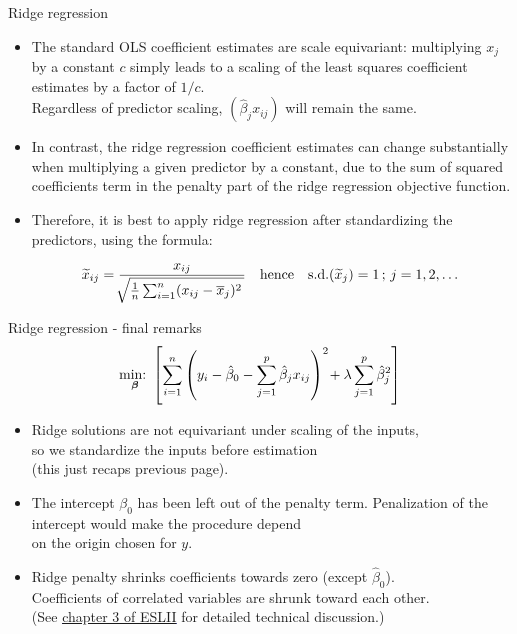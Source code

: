 \documentclass{beamer}
\begin{document}
\begin{frame}{Ridge regression}
\begin{itemize}
\item The standard OLS coefficient estimates are scale
equivariant: multiplying $x_j$ by a constant $c$ simply leads to
a scaling of the least squares coefficient estimates by a
factor of $1/c$.\\ 
\medskip Regardless of predictor scaling, $ ( \hat{\beta}_j x_{ij} )$ will remain the same.
\medskip
\item In contrast, the ridge regression coefficient estimates can
change substantially when multiplying a given predictor by
a constant, due to the sum of squared coefficients term in
the penalty part of the ridge regression objective function.
\medskip
\item Therefore, it is best to apply ridge regression after
standardizing the predictors, using the formula:

$$ \widetilde{x}_{ij} = \frac{x_{ij}}{
   \sqrt[]{\frac{1}{n} \sum_{i=1}^n (x_{ij} - \overline{x}_j)^2 \,}}
   \quad \textnormal{hence} \quad
   \textnormal{s.d.}(\widetilde{x}_{j}) = 1\, ; \, j=1,2,\dots$$
 
\end{itemize}
\end{frame}
\begin{frame}{Ridge regression - final remarks}
$$\underset{\bm{\beta}}{\textnormal{min:~}} 
\left[ \sum_{i=1}^n \left(y_i - \hat{\beta}_0 
- \sum_{j=1}^p  \hat{\beta}_j x_{ij} \right)^2 
\! + \lambda \sum_{j=1}^p  \hat{\beta}_j^2 \right]
$$
\begin{itemize}
\item Ridge solutions are not equivariant under scaling of the inputs, 
\\so we standardize the inputs before estimation \\(this just recaps previous page).
\medskip
\item The intercept $\beta_0$ has been left out of the penalty term. Penalization of the intercept would make the procedure depend \\on the origin chosen for $y$.
\medskip
\item Ridge penalty shrinks coefficients towards zero (except $\hat{\beta}_0$). \\Coefficients of correlated variables are shrunk toward each other. \\ (See 
\textcolor{blue}{\underline{\href{https://web.stanford.edu/~hastie/ElemStatLearn/}{chapter 3 of ESLII}}} for detailed technical discussion.)
\end{itemize}
\end{frame}
\end{document}
